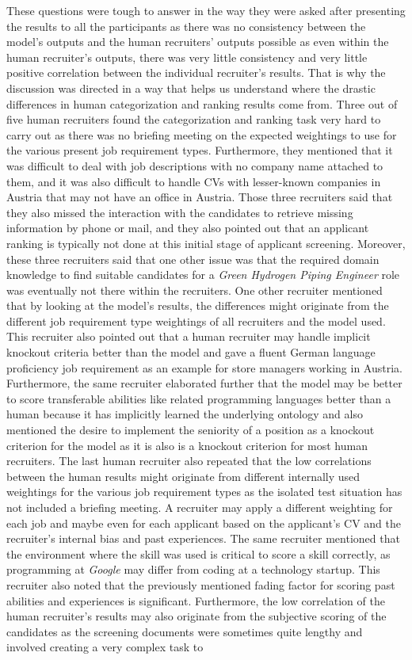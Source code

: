 \documentclass[draft,final]{thesisclass} %
\begin{document}
\begin{enumerate}
\begin{itemize}
        These questions were tough to answer in the way they were asked after presenting the results to all the participants as there was no consistency between the model's outputs and the human recruiters' outputs possible as even within the human recruiter's outputs, there was very little consistency and very little positive correlation between the individual recruiter's results. That is why the discussion was directed in a way that helps us understand where the drastic differences in human categorization and ranking results come from. Three out of five human recruiters found the categorization and ranking task very hard to carry out as there was no briefing meeting on the expected weightings to use for the various present job requirement types. Furthermore, they mentioned that it was difficult to deal with job descriptions with no company name attached to them, and it was also difficult to handle \acs{CV}s with lesser-known companies in Austria that may not have an office in Austria. Those three recruiters said that they also missed the interaction with the candidates to retrieve missing information by phone or mail, and they also pointed out that an applicant ranking is typically not done at this initial stage of applicant screening. Moreover, these three recruiters said that one other issue was that the required domain knowledge to find suitable candidates for a \textit{Green Hydrogen Piping Engineer} role was eventually not there within the recruiters. One other recruiter mentioned that by looking at the model's results, the differences might originate from the different job requirement type weightings of all recruiters and the model used. This recruiter also pointed out that a human recruiter may handle implicit knockout criteria better than the model and gave a fluent German language proficiency job requirement as an example for store managers working in Austria. Furthermore, the same recruiter elaborated further that the model may be better to score transferable abilities like related programming languages better than a human because it has implicitly learned the underlying ontology and also mentioned the desire to implement the seniority of a position as a knockout criterion for the model as it is also is a knockout criterion for most human recruiters. The last human recruiter also repeated that the low correlations between the human results might originate from different internally used weightings for the various job requirement types as the isolated test situation has not included a briefing meeting. A recruiter may apply a different weighting for each job and maybe even for each applicant based on the applicant's \acs{CV} and the recruiter's internal bias and past experiences. The same recruiter mentioned that the environment where the skill was used is critical to score a skill correctly, as programming at \textit{Google} may differ from coding at a technology startup. This recruiter also noted that the previously mentioned fading factor for scoring past abilities and experiences is significant. Furthermore, the low correlation of the human recruiter's results may also originate from the subjective scoring of the candidates as the screening documents were sometimes quite lengthy and involved creating a very complex task to 
\end{itemize}
\end{enumerate}
\end{document}
